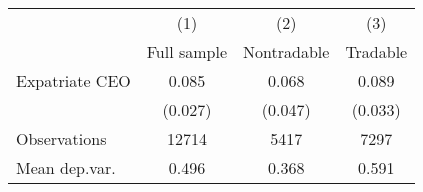 \begin{tabular}{l*{3}{c}}
\hline\hline
                    &\multicolumn{1}{c}{(1)}&\multicolumn{1}{c}{(2)}&\multicolumn{1}{c}{(3)}\\
                    &\multicolumn{1}{c}{Full sample}&\multicolumn{1}{c}{Nontradable}&\multicolumn{1}{c}{Tradable}\\
\hline
Expatriate CEO      &       0.085&       0.068&       0.089\\
                    &     (0.027)&     (0.047)&     (0.033)\\
\hline
Observations        &       12714&        5417&        7297\\
Mean dep.var.       &       0.496&       0.368&       0.591\\
\hline\hline
\end{tabular}
